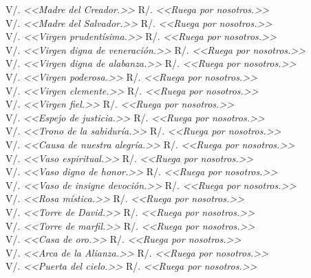 \documentclass[12pt, letterpaper]{report}
\begin{document}
    \Large V/. \textit{<<Madre del Creador.>>} \hfill{R/. \textit{<<Ruega por nosotros.>>}}\\
    \Large V/. \textit{<<Madre del Salvador.>>} \hfill{R/. \textit{<<Ruega por nosotros.>>}}\\
    \Large V/. \textit{<<Virgen prudentísima.>>} \hfill{R/. \textit{<<Ruega por nosotros.>>}}\\
    \Large V/. \textit{<<Virgen digna de veneración.>>} \hfill{R/. \textit{<<Ruega por nosotros.>>}}\\
    \Large V/. \textit{<<Virgen digna de alabanza.>>} \hfill{R/. \textit{<<Ruega por nosotros.>>}}\\
    \Large V/. \textit{<<Virgen poderosa.>>} \hfill{R/. \textit{<<Ruega por nosotros.>>}}\\
    \Large V/. \textit{<<Virgen clemente.>>} \hfill{R/. \textit{<<Ruega por nosotros.>>}}\\
    \Large V/. \textit{<<Virgen fiel.>>} \hfill{R/. \textit{<<Ruega por nosotros.>>}}\\
    \Large V/. \textit{<<Espejo de justicia.>>} \hfill{R/. \textit{<<Ruega por nosotros.>>}}\\
    \Large V/. \textit{<<Trono de la sabiduría.>>} \hfill{R/. \textit{<<Ruega por nosotros.>>}}\\
    \Large V/. \textit{<<Causa de nuestra alegría.>>} \hfill{R/. \textit{<<Ruega por nosotros.>>}}\\
    \Large V/. \textit{<<Vaso espiritual.>>} \hfill{R/. \textit{<<Ruega por nosotros.>>}}\\
    \Large V/. \textit{<<Vaso digno de honor.>>} \hfill{R/. \textit{<<Ruega por nosotros.>>}}\\
    \Large V/. \textit{<<Vaso de insigne devoción.>>} \hfill{R/. \textit{<<Ruega por nosotros.>>}}\\
    \Large V/. \textit{<<Rosa mística.>>} \hfill{R/. \textit{<<Ruega por nosotros.>>}}\\
    \Large V/. \textit{<<Torre de David.>>} \hfill{R/. \textit{<<Ruega por nosotros.>>}}\\
    \Large V/. \textit{<<Torre de marfil.>>} \hfill{R/. \textit{<<Ruega por nosotros.>>}}\\
    \Large V/. \textit{<<Casa de oro.>>} \hfill{R/. \textit{<<Ruega por nosotros.>>}}\\
    \Large V/. \textit{<<Arca de la Alianza.>>} \hfill{R/. \textit{<<Ruega por nosotros.>>}}\\
    \Large V/. \textit{<<Puerta del cielo.>>} \hfill{R/. \textit{<<Ruega por nosotros.>>}}\\
\end{document}

